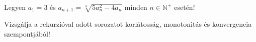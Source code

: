 \documentclass[11pt]{scrartcl}
\begin{document}
Legyen $a_1 = 3$ és $a_{n + 1} = \sqrt[3]{5a_n^2 - 4a_n}$ minden
$n \in \mathbb{N}^+$ esetén!

Vizsgálja a rekurzióval adott sorozatot korlátosság, monotonitás és
konvergencia szempontjából!
\end{document}

